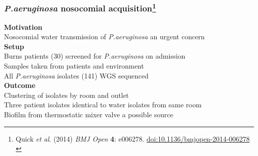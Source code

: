 \begin{frame}
  \frametitle{\textit{P.aeruginosa} nosocomial acquisition\footnote{\tiny{Quick \textit{et al}. (2014) \textit{BMJ Open} \textbf{4}: e006278. \href{http://dx.doi.org/10.1136/bmjopen-2014-006278}{doi:10.1136/bmjopen-2014-006278}}\\}}
  \textbf{Motivation} \\
  Nosocomial water transmission of \textit{P.aeruginosa} an urgent concern \\
  \textbf{Setup} \\
  Burns patients (30) screened for \textit{P.aeruginosa} on admission \\
  Samples taken from patients and environment \\
  All \textit{P.aeruginosa} isolates (141) WGS sequenced \\
  \textbf{Outcome} \\  
  Clustering of isolates by room and outlet \\
  Three patient isolates identical to water isolates from same room \\
  Biofilm from thermostatic mixer valve a possible source \\
\end{frame}

